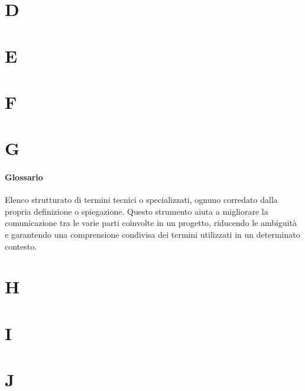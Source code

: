 \documentclass[italian,12pt]{article} %
\newcommand{\glossdef}[2]{\paragraph{#1}#2}
\begin{document}
\newpage

\section{D}



\newpage

\section{E}



\newpage

\section{F}



\newpage

\section{G}
\glossdef{Glossario}{
	Elenco strutturato di termini tecnici o specializzati, ognuno corredato dalla propria definizione o spiegazione. Questo strumento aiuta a migliorare la comunicazione tra le varie parti coinvolte in un progetto, riducendo le ambiguità e garantendo una comprensione condivisa dei termini utilizzati in un determinato contesto.
}



\newpage

\section{H}



\newpage

\section{I}



\newpage

\section{J}
\end{document}
